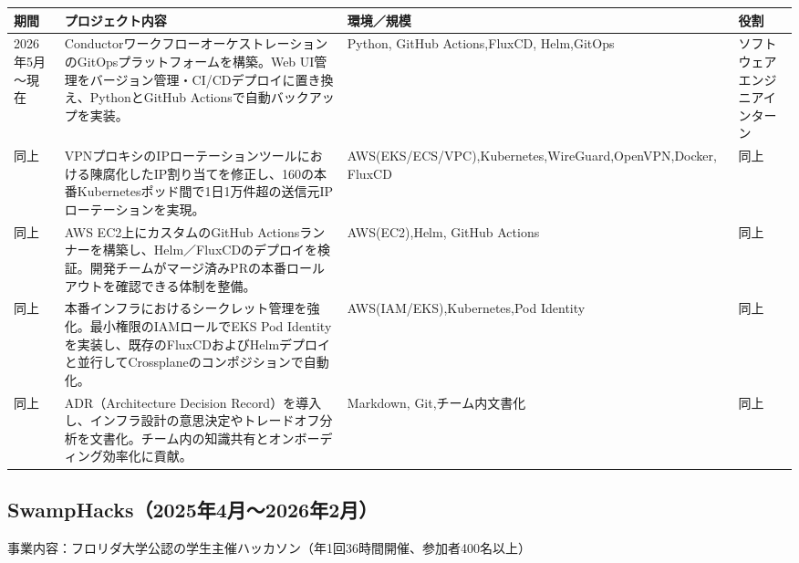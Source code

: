 \documentclass[dvipdfmx,a4paper]{jsarticle}
\begin{document}
\begin{center}
\small
\begin{tabularx}{\textwidth}{|p{2.8cm}|X|p{3.8cm}|p{3.5cm}|}
\hline
期間 & プロジェクト内容 & 環境／規模 & 役割 \\ \hline
2026年5月～\newline 現在
	& ConductorワークフローオーケストレーションのGitOpsプラットフォームを構築。Web UI管理をバージョン管理・CI/CDデプロイに置き換え、PythonとGitHub Actionsで自動バックアップを実装。
	& Python, GitHub Actions,\newline FluxCD, Helm,\newline GitOps
	& ソフトウェアエンジニア\newline インターン \\ \hline
同上
	& VPNプロキシのIPローテーションツールにおける陳腐化したIP割り当てを修正し、160の本番Kubernetesポッド間で1日1万件超の送信元IPローテーションを実現。
	& AWS(EKS/ECS/VPC),\newline Kubernetes,\newline WireGuard,\newline \mbox{OpenVPN},\newline Docker, FluxCD
	& 同上 \\ \hline
同上
	& AWS EC2上にカスタムのGitHub Actionsランナーを構築し、Helm／FluxCDのデプロイを検証。開発チームがマージ済みPRの本番ロールアウトを確認できる体制を整備。
	& AWS(EC2),\newline Helm, GitHub Actions
	& 同上 \\ \hline
同上
	& 本番インフラにおけるシークレット管理を強化。最小権限のIAMロールでEKS Pod Identityを実装し、既存のFluxCDおよびHelmデプロイと並行してCrossplaneのコンポジションで自動化。
	& AWS(IAM/EKS),\newline Kubernetes,\newline Pod Identity
	& 同上 \\ \hline
同上
    & ADR（Architecture Decision Record）を導入し、インフラ設計の意思決定やトレードオフ分析を文書化。チーム内の知識共有とオンボーディング効率化に貢献。 
	& Markdown, Git,\newline チーム内文書化
	& 同上 \\ \hline
\end{tabularx}
\end{center}

\subsection*{SwampHacks（2025年4月～2026年2月）}
事業内容：フロリダ大学公認の学生主催ハッカソン（年1回36時間開催、参加者400名以上）
\end{document}
